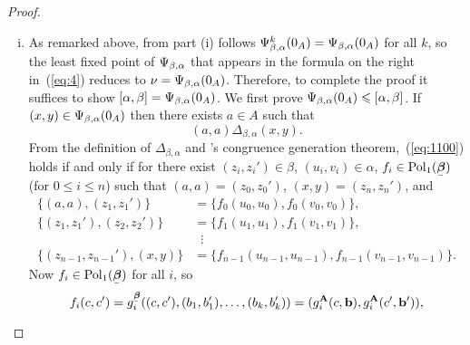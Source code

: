 \begin{proof}
\begin{enumerate}[(i)]
\item
  As remarked above, from part (i) follows 
  $\Psi_{\beta, \alpha}^{k}(0_A) = \Psi_{\beta, \alpha}(0_A)$ for all $k$, so the least fixed point of
  $\Psi_{\beta, \alpha}$ that appears in the formula on the right in~(\ref{eq:4}) reduces
  to $\nu = \Psi_{\beta, \alpha}(0_A)$.  Therefore, to complete the proof it suffices to show
  $[\alpha, \beta] = \Psi_{\beta, \alpha}(0_A)$.
  We first prove $\Psi_{\beta, \alpha}(0_A)\leqslant   [\alpha, \beta]$.
  If $(x,y)\in \Psi_{\beta, \alpha}(0_A)$ then there exists $a \in A$ such that 
    \begin{equation}
      \label{eq:1100}
     (a,a) \mathrel{\Delta_{\beta, \alpha}} (x,y).
    \end{equation}
    From the definition of $\Delta_{\beta, \alpha}$ and 
    \malcev's congruence generation theorem,~(\ref{eq:1100})
    holds if and only if for there exist
    $(z_i, z_i') \in \beta$, $(u_i, v_i) \in \alpha$, 
    $f_i \in \Pol_1(\bbeta)$ (for $0\leq i \leq n$) such that $(a, a) = (z_0,z_0')$, $(x, y)=(z_n,z_n')$, and
    \begin{align}
      \label{eq:001}
      \{(a, a),(z_1,z_1')\} &= \{f_0(u_0,u_0), f_0(v_0,v_0)\},\\
      \label{eq:011}
      \{(z_1,z_1'),(z_2,z_2')\} &= \{f_1(u_1,u_1), f_1(v_1,v_1)\},\\
      \nonumber
      &\; \; \vdots\\
      \nonumber
      \{(z_{n-1},z_{n-1}'),(x, y)\} &= \{f_{n-1}(u_{n-1},u_{n-1}), f_{n-1}(v_{n-1},v_{n-1})\}.
    \end{align}
    Now $f_i \in \Pol_1(\bbeta)$ for all $i$, so
    \newcommand\gA{\ensuremath{g^{\bA}}}%
    \[      f_i(c, c') = g_i^{\bbeta}((c, c'), (b_1, b_1'), \dots, (b_k, b_k') )
      = (\gA_i(c, \bb), \gA_i(c', \bb')),%
      \]%

\end{enumerate}
\end{proof}
